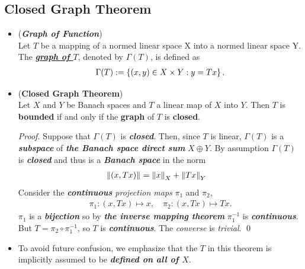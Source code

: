 \documentclass[11pt]{article}
\begin{document}
\subsection{Closed Graph Theorem}
\begin{itemize}
\item \begin{definition} (\emph{\textbf{Graph of Function}})\\
Let $Τ$ be a mapping of a normed linear space X into a normed  linear space Y. The \underline{\emph{\textbf{graph of $T$}}}, denoted by $\Gamma(T)$, is defined as 
\begin{align*}
\Gamma(T) := \left\{(x,y) \in X \times Y: y = Tx\right\}.
\end{align*}
\end{definition}


\item \begin{theorem} (\textbf{Closed Graph Theorem})\citep{reed1980methods} \\
Let $X$ and $Y$ be Banach spaces  and $T$ a linear map of $X$ into $Y$. Then $T$ is \textbf{bounded} if and only if the \textbf{graph} of 
$Τ$ is \textbf{closed}. 
\end{theorem}
\begin{proof}
Suppose that $\Gamma(T)$ is \emph{\textbf{closed}}. Then, since $Τ$ is linear, $\Gamma(T)$ is a \emph{\textbf{subspace}}  of \emph{\textbf{the Banach space direct sum}} $X \oplus Y$. By assumption $\Gamma(T)$ is \emph{\textbf{closed}} and thus is a \emph{\textbf{Banach space}} in the norm 
\begin{align*}
\left\|(x, Tx)\right\|_{} &= \left\|x\right\|_{X} + \left\|Tx\right\|_{Y}
\end{align*}
Consider the \emph{\textbf{continuous} projection maps} $\pi_1$ and $\pi_2$, 
\begin{align*}
\pi_1: (x, Tx) \mapsto x, \quad \pi_2: (x, Tx) \mapsto Tx.
\end{align*}
$\pi_1$ is a \emph{\textbf{bijection}} so by \emph{\textbf{the inverse mapping theorem}} $\pi_1^{-1}$ is \emph{\textbf{continuous}}. But 
$T = \pi_2 \circ \pi_1^{-1}$, so $T$ is \emph{\textbf{continuous}}. The \emph{converse} is \emph{trivial}. \qed 
\end{proof}

\item \begin{remark}
To avoid future confusion, we emphasize that the $T$ in this theorem is implicitly assumed to be \emph{\textbf{defined on all of $X$}}. 
\end{remark}


\end{itemize}
\end{document}
